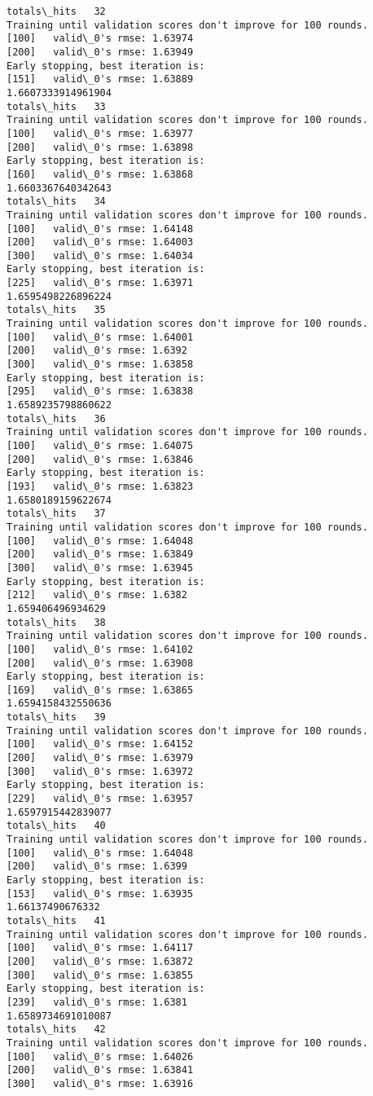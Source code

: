 \documentclass[11pt]{article}
\begin{document}
\begin{Verbatim}[commandchars=\\\{\}]
totals\_hits   32
Training until validation scores don't improve for 100 rounds.
[100]	valid\_0's rmse: 1.63974
[200]	valid\_0's rmse: 1.63949
Early stopping, best iteration is:
[151]	valid\_0's rmse: 1.63889
1.6607333914961904
totals\_hits   33
Training until validation scores don't improve for 100 rounds.
[100]	valid\_0's rmse: 1.63977
[200]	valid\_0's rmse: 1.63898
Early stopping, best iteration is:
[160]	valid\_0's rmse: 1.63868
1.6603367640342643
totals\_hits   34
Training until validation scores don't improve for 100 rounds.
[100]	valid\_0's rmse: 1.64148
[200]	valid\_0's rmse: 1.64003
[300]	valid\_0's rmse: 1.64034
Early stopping, best iteration is:
[225]	valid\_0's rmse: 1.63971
1.6595498226896224
totals\_hits   35
Training until validation scores don't improve for 100 rounds.
[100]	valid\_0's rmse: 1.64001
[200]	valid\_0's rmse: 1.6392
[300]	valid\_0's rmse: 1.63858
Early stopping, best iteration is:
[295]	valid\_0's rmse: 1.63838
1.6589235798860622
totals\_hits   36
Training until validation scores don't improve for 100 rounds.
[100]	valid\_0's rmse: 1.64075
[200]	valid\_0's rmse: 1.63846
Early stopping, best iteration is:
[193]	valid\_0's rmse: 1.63823
1.6580189159622674
totals\_hits   37
Training until validation scores don't improve for 100 rounds.
[100]	valid\_0's rmse: 1.64048
[200]	valid\_0's rmse: 1.63849
[300]	valid\_0's rmse: 1.63945
Early stopping, best iteration is:
[212]	valid\_0's rmse: 1.6382
1.659406496934629
totals\_hits   38
Training until validation scores don't improve for 100 rounds.
[100]	valid\_0's rmse: 1.64102
[200]	valid\_0's rmse: 1.63908
Early stopping, best iteration is:
[169]	valid\_0's rmse: 1.63865
1.6594158432550636
totals\_hits   39
Training until validation scores don't improve for 100 rounds.
[100]	valid\_0's rmse: 1.64152
[200]	valid\_0's rmse: 1.63979
[300]	valid\_0's rmse: 1.63972
Early stopping, best iteration is:
[229]	valid\_0's rmse: 1.63957
1.6597915442839077
totals\_hits   40
Training until validation scores don't improve for 100 rounds.
[100]	valid\_0's rmse: 1.64048
[200]	valid\_0's rmse: 1.6399
Early stopping, best iteration is:
[153]	valid\_0's rmse: 1.63935
1.66137490676332
totals\_hits   41
Training until validation scores don't improve for 100 rounds.
[100]	valid\_0's rmse: 1.64117
[200]	valid\_0's rmse: 1.63872
[300]	valid\_0's rmse: 1.63855
Early stopping, best iteration is:
[239]	valid\_0's rmse: 1.6381
1.6589734691010087
totals\_hits   42
Training until validation scores don't improve for 100 rounds.
[100]	valid\_0's rmse: 1.64026
[200]	valid\_0's rmse: 1.63841
[300]	valid\_0's rmse: 1.63916

\end{Verbatim}
\end{document}
